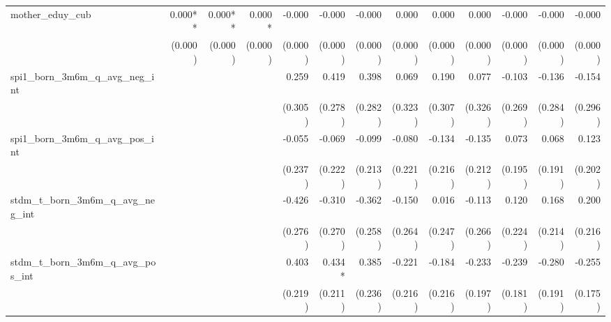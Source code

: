 \begin{tabular}{lrrrrrrrrrrrr}
mother\_eduy\_cub                           &      0.000** &      0.000** &       0.000* &       -0.000 &       -0.000 &       -0.000 &        0.000 &        0.000 &        0.000 &       -0.000 &       -0.000 &       -0.000 \\ 
                                            &      (0.000) &      (0.000) &      (0.000) &      (0.000) &      (0.000) &      (0.000) &      (0.000) &      (0.000) &      (0.000) &      (0.000) &      (0.000) &      (0.000) \\ 
spi1\_born\_3m6m\_q\_avg\_neg\_int          &              &              &              &        0.259 &        0.419 &        0.398 &        0.069 &        0.190 &        0.077 &       -0.103 &       -0.136 &       -0.154 \\ 
                                            &              &              &              &      (0.305) &      (0.278) &      (0.282) &      (0.323) &      (0.307) &      (0.326) &      (0.269) &      (0.284) &      (0.296) \\ 
spi1\_born\_3m6m\_q\_avg\_pos\_int          &              &              &              &       -0.055 &       -0.069 &       -0.099 &       -0.080 &       -0.134 &       -0.135 &        0.073 &        0.068 &        0.123 \\ 
                                            &              &              &              &      (0.237) &      (0.222) &      (0.213) &      (0.221) &      (0.216) &      (0.212) &      (0.195) &      (0.191) &      (0.202) \\ 
stdm\_t\_born\_3m6m\_q\_avg\_neg\_int       &              &              &              &       -0.426 &       -0.310 &       -0.362 &       -0.150 &        0.016 &       -0.113 &        0.120 &        0.168 &        0.200 \\ 
                                            &              &              &              &      (0.276) &      (0.270) &      (0.258) &      (0.264) &      (0.247) &      (0.266) &      (0.224) &      (0.214) &      (0.216) \\ 
stdm\_t\_born\_3m6m\_q\_avg\_pos\_int       &              &              &              &        0.403 &       0.434* &        0.385 &       -0.221 &       -0.184 &       -0.233 &       -0.239 &       -0.280 &       -0.255 \\ 
                                            &              &              &              &      (0.219) &      (0.211) &      (0.236) &      (0.216) &      (0.216) &      (0.197) &      (0.181) &      (0.191) &      (0.175) \\ 

\end{tabular}
